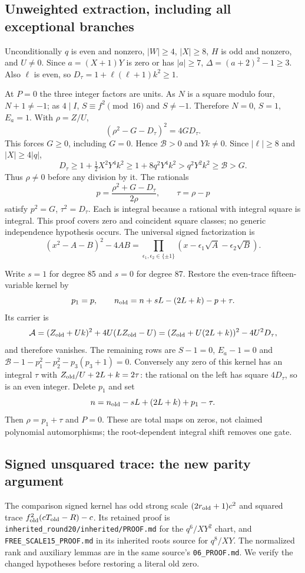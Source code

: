 \subsection{Unweighted extraction, including all exceptional branches}
Unconditionally $q$ is even and nonzero, $|W|\ge4$, $|X|\ge8$, $H$ is odd and
nonzero, and $U\ne0$. Since $a=(X+1)Y$ is zero or has $|a|\ge7$,
$\Delta=(a+2)^2-1\ge3$. Also $\ell$ is even, so
$D_\tau=1+\ell(\ell+1)k^2\ge1$.

At $P=0$ the three integer factors are units. As $N$ is a square modulo four,
$N+1\ne-1$; as $4\mid I$, $S\equiv f^2\pmod {16}$ and $S\ne-1$.
Therefore $N=0$, $S=1$, $E_a=1$. With $\rho=Z/U$,
\[
 (\rho^2-G-D_\tau)^2=4GD_\tau.
\]
This forces $G\ge0$, including $G=0$. Hence $\mathcal B>0$ and $Yk\ne0$.
Since $|\ell|\ge8$ and $|X|\ge4|q|$,
\[
 D_\tau\ge1+\tfrac12X^2Y^4k^2
 \ge1+8q^2Y^4k^2>q^2Y^2k^2\ge\mathcal B>G.
\]
Thus $\rho\ne0$ before any division by it. The rationals
\[
 p=\frac{\rho^2+G-D_\tau}{2\rho},\qquad \tau=\rho-p
\]
satisfy $p^2=G$, $\tau^2=D_\tau$. Each is integral because a rational with
integral square is integral. This proof covers zero and coincident square classes;
no generic independence hypothesis occurs. The universal signed factorization is
\[
 (x^2-A-B)^2-4AB=\prod_{\epsilon_1,\epsilon_2\in\{\pm1\}}
 (x-\epsilon_1\sqrt A-\epsilon_2\sqrt B).
\]

Write $s=1$ for degree 85 and $s=0$ for degree 87. Restore the even-trace
fifteen-variable kernel by
\[
 p_1=p,\qquad n_{\rm old}=n+sL-(2L+k)-p+\tau.
\]
Its carrier is
\[
 \mathcal A=(Z_{\rm old}+Uk)^2+4U(LZ_{\rm old}-U)
           =(Z_{\rm old}+U(2L+k))^2-4U^2D_\tau,
\]
and therefore vanishes. The remaining rows are $S-1=0$, $E_a-1=0$ and
$\mathcal B-1-p_1^2-p_2^2-p_3(p_3+1)=0$. Conversely any zero of this kernel
has an integral $\tau$ with $Z_{\rm old}/U+2L+k=2\tau$: the rational on the
left has square $4D_\tau$, so is an even integer. Delete $p_1$ and set
\[
 n=n_{\rm old}-sL+(2L+k)+p_1-\tau.
\]
Then $\rho=p_1+\tau$ and $P=0$. These are total maps on zeros, not claimed
polynomial automorphisms; the root-dependent integral shift removes one gate.

\subsection{Signed unsquared trace: the new parity argument}
The comparison signed kernel has odd strong scale $(2r_{\rm old}+1)c^2$ and
squared trace $f_{\rm old}^2(cT_{\rm old}-R)-c$. Its retained proof is
\texttt{inherited\_round20/inherited/PROOF.md} for the $q^6/XY^2$ chart, and
\texttt{FREE\_SCALE15\_PROOF.md} in its inherited roots source for $q^8/XY$.
The normalized rank and auxiliary lemmas are in the same source's
\texttt{06\_PROOF.md}. We verify the changed hypotheses before restoring a
literal old zero.

